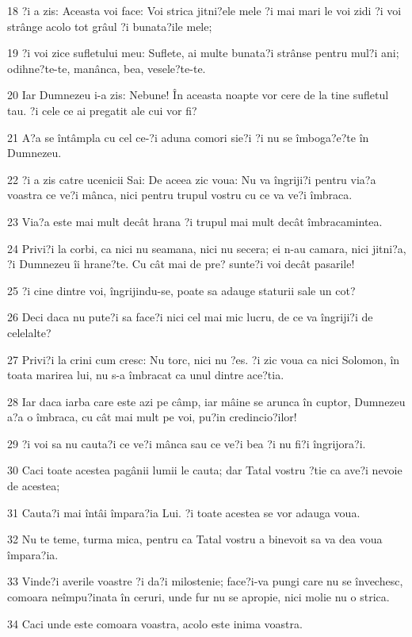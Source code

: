 \par 18 ?i a zis: Aceasta voi face: Voi strica jitni?ele mele ?i mai mari le voi zidi ?i voi strânge acolo tot grâul ?i bunata?ile mele;
\par 19 ?i voi zice sufletului meu: Suflete, ai multe bunata?i strânse pentru mul?i ani; odihne?te-te, manânca, bea, vesele?te-te.
\par 20 Iar Dumnezeu i-a zis: Nebune! În aceasta noapte vor cere de la tine sufletul tau. ?i cele ce ai pregatit ale cui vor fi?
\par 21 A?a se întâmpla cu cel ce-?i aduna comori sie?i ?i nu se îmboga?e?te în Dumnezeu.
\par 22 ?i a zis catre ucenicii Sai: De aceea zic voua: Nu va îngriji?i pentru via?a voastra ce ve?i mânca, nici pentru trupul vostru cu ce va ve?i îmbraca.
\par 23 Via?a este mai mult decât hrana ?i trupul mai mult decât îmbracamintea.
\par 24 Privi?i la corbi, ca nici nu seamana, nici nu secera; ei n-au camara, nici jitni?a, ?i Dumnezeu îi hrane?te. Cu cât mai de pre? sunte?i voi decât pasarile!
\par 25 ?i cine dintre voi, îngrijindu-se, poate sa adauge staturii sale un cot?
\par 26 Deci daca nu pute?i sa face?i nici cel mai mic lucru, de ce va îngriji?i de celelalte?
\par 27 Privi?i la crini cum cresc: Nu torc, nici nu ?es. ?i zic voua ca nici Solomon, în toata marirea lui, nu s-a îmbracat ca unul dintre ace?tia.
\par 28 Iar daca iarba care este azi pe câmp, iar mâine se arunca în cuptor, Dumnezeu a?a o îmbraca, cu cât mai mult pe voi, pu?in credincio?ilor!
\par 29 ?i voi sa nu cauta?i ce ve?i mânca sau ce ve?i bea ?i nu fi?i îngrijora?i.
\par 30 Caci toate acestea pagânii lumii le cauta; dar Tatal vostru ?tie ca ave?i nevoie de acestea;
\par 31 Cauta?i mai întâi împara?ia Lui. ?i toate acestea se vor adauga voua.
\par 32 Nu te teme, turma mica, pentru ca Tatal vostru a binevoit sa va dea voua împara?ia.
\par 33 Vinde?i averile voastre ?i da?i milostenie; face?i-va pungi care nu se învechesc, comoara neîmpu?inata în ceruri, unde fur nu se apropie, nici molie nu o strica.
\par 34 Caci unde este comoara voastra, acolo este inima voastra.
